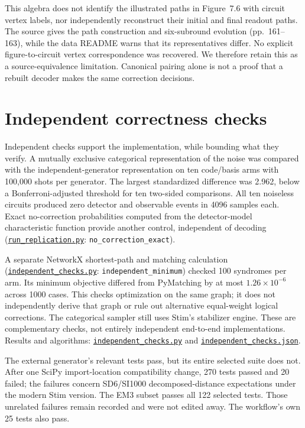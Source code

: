 \documentclass[11pt]{article}
\newcommand{\file}[2]{\href{https://github.com/alectionary/vibe-math/blob/master/formalization/higgott-quantum-decoding/#1}{\nolinkurl{#2}}}
\begin{document}
This algebra does not identify the illustrated paths in Figure~7.6 with circuit vertex labels, nor independently reconstruct their initial and final readout paths. The source gives the path construction and six-subround evolution (pp.~161--163), while the data README warns that its representatives differ. No explicit figure-to-circuit vertex correspondence was recovered. We therefore retain this as a source-equivalence limitation. Canonical pairing alone is not a proof that a rebuilt decoder makes the same correction decisions.

\section{Independent correctness checks}
Independent checks support the implementation, while bounding what they verify. A mutually exclusive categorical representation of the noise was compared with the independent-generator representation on ten code/basis arms with 100,000 shots per generator. The largest standardized difference was 2.962, below a Bonferroni-adjusted threshold for ten two-sided comparisons. All ten noiseless circuits produced zero detector and observable events in 4096 samples each. Exact no-correction probabilities computed from the detector-model characteristic function provide another control, independent of decoding (\file{run_replication.py\#L8}{run_replication.py}: \texttt{no\_correction\_exact}).

A separate NetworkX shortest-path and matching calculation (\file{independent_checks.py\#L26}{independent_checks.py}: \nolinkurl{independent_minimum}) checked 100 syndromes per arm. Its minimum objective differed from PyMatching by at most $1.26\times10^{-6}$ across 1000 cases. This checks optimization on the same graph; it does not independently derive that graph or rule out alternative equal-weight logical corrections. The categorical sampler still uses Stim's stabilizer engine. These are complementary checks, not entirely independent end-to-end implementations. Results and algorithms: \file{independent_checks.py}{independent_checks.py} and \file{provenance/independent_checks.json}{independent_checks.json}.

The external generator's relevant tests pass, but its entire selected suite does not. After one SciPy import-location compatibility change, 270 tests passed and 20 failed; the failures concern SD6/SI1000 decomposed-distance expectations under the modern Stim version. The EM3 subset passes all 122 selected tests. Those unrelated failures remain recorded and were not edited away. The workflow's own 25 tests also pass.
\end{document}
